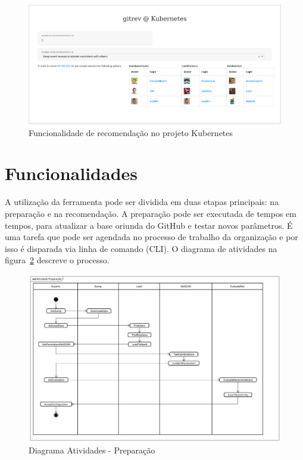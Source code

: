 \documentclass[12pt,openany,oneside,a4paper,english,brazil]{abntbibufjf}
\begin{document}
    \begin{figure}[!htbp]
     \includegraphics[width=\columnwidth]{web-interface}
     \caption{Funcionalidade de recomendação no projeto Kubernetes}\label{fig:web-interface}
    \end{figure}



   \section{Funcionalidades}\label{sec:funcionalidades}

   A utilização da ferramenta pode ser dividida em duas etapas principais: na preparação e na recomendação. A preparação pode ser executada de tempos em tempos, para atualizar a base oriunda do GitHub e testar novos parâmetros. É uma tarefa que pode ser agendada no processo de trabalho da organização e por isso é disparada via linha de comando (CLI). O diagrama de atividades na figura~\ref{fig:atividade} descreve o processo.

   \begin{figure}[!htbp]
    \includegraphics[width=\textwidth]{atividade}
    \caption{Diagrama Atividades - Preparação}\label{fig:atividade}
   \end{figure}
\end{document}
